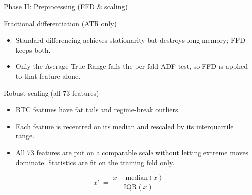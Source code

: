 \documentclass[aspectratio=169, t]{beamer}
\begin{document}
\begin{frame}{Phase II: Preprocessing (FFD \& scaling)}
\vspace{-0.4em}

{
\begin{block}{Fractional differentiation (ATR only)}
\footnotesize
\begin{itemize}\setlength{\itemsep}{3pt}
  \item Standard differencing achieves stationarity but destroys long memory; FFD keeps both.
  \item Only the Average True Range fails the per-fold ADF test, so FFD is applied to that feature alone. 
\end{itemize}
\end{block}
}

\vspace{0.3em}

{
\begin{block}{Robust scaling (all 73 features)}
\footnotesize
\begin{itemize}\setlength{\itemsep}{3pt}
  \item BTC features have fat tails and regime-break outliers.
  \item Each feature is recentred on its median and rescaled by its interquartile range.
  \item All 73 features are put on a comparable scale without letting extreme moves dominate. Statistics are fit on the training fold only.
\end{itemize}
\vspace{-0.3em}
\[
  x' \;=\; \frac{x - \mathrm{median}(x)}{\mathrm{IQR}(x)}
\]
\vspace{-0.9em}
\end{block}
}

\end{frame}
\end{document}
